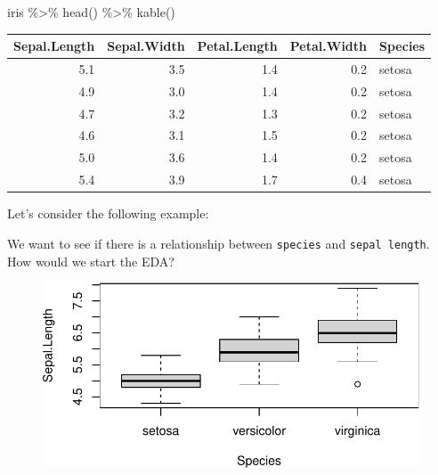 \documentclass[
  letterpaper,
  DIV=11,
  numbers=noendperiod]{scrartcl}
\newenvironment{Shaded}{\begin{snugshade}}{\end{snugshade}}
\newcommand{\FunctionTok}[1]{\textcolor[rgb]{0.28,0.35,0.67}{#1}}
\newcommand{\NormalTok}[1]{\textcolor[rgb]{0.00,0.23,0.31}{#1}}
\newcommand{\OtherTok}[1]{\textcolor[rgb]{0.00,0.23,0.31}{#1}}
\newcommand{\SpecialCharTok}[1]{\textcolor[rgb]{0.37,0.37,0.37}{#1}}
\begin{document}
\begin{Shaded}
\begin{Highlighting}[]
\NormalTok{iris }\SpecialCharTok{\%\textgreater{}\%} \FunctionTok{head}\NormalTok{() }\SpecialCharTok{\%\textgreater{}\%} \FunctionTok{kable}\NormalTok{()}
\end{Highlighting}
\end{Shaded}

\begin{tabular}{r|r|r|r|l}
\hline
Sepal.Length & Sepal.Width & Petal.Length & Petal.Width & Species\\
\hline
5.1 & 3.5 & 1.4 & 0.2 & setosa\\
\hline
4.9 & 3.0 & 1.4 & 0.2 & setosa\\
\hline
4.7 & 3.2 & 1.3 & 0.2 & setosa\\
\hline
4.6 & 3.1 & 1.5 & 0.2 & setosa\\
\hline
5.0 & 3.6 & 1.4 & 0.2 & setosa\\
\hline
5.4 & 3.9 & 1.7 & 0.4 & setosa\\
\hline
\end{tabular}

Let's consider the following example:

We want to see if there is a relationship between \texttt{species} and
\texttt{sepal\ length}. How would we start the EDA?

\begin{Shaded}
\end{Shaded}

\begin{figure}[H]

{\centering \includegraphics{index_files/figure-pdf/unnamed-chunk-6-1.pdf}

}

\end{figure}
\end{document}
